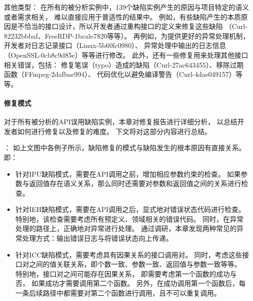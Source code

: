 
\vspace*{10pt}
\begin{center}
	\noindent{}
\end{center}

{其他类型}：
在所有的被分析实例中，139个缺陷实例产生的原因与项目特定的语义或者需求相关，
难以直接应用于普适性的结果中。
例如，有些缺陷产生的本质原因是不恰当的接口设计，所以开发者通过重构接口的定义来修复这些缺陷
（Curl-82232bbbaf、FreeRDP-1bcale7820等等）。
再例如，为提供更好的异常处理机制，开发者对日志记录接口（Linux-5b60fc0980）、
异常处理中输出的日志信息（OpenSSL-0cb8c9d85e）等等进行修改。
此外，还有一些修复用来处理其他接口相关错误，包括：
修复笔误（typo）造成的缺陷（Curl-27ac643455）、移除过期函数（FFmpeg-2dafbae994）、
代码优化以避免编译警告（Curl-4dae049157）等等。

\paragraph{修复模式}
对于所有被分析的API误用缺陷实例，本章对修复报告进行详细分析，
以总结开发者如何进行修复以及修复的难度。
下文将对这部分内容进行总结。

{}：
如上文图中各例子所示，缺陷修复的模式与缺陷发生的根本原因有直接关系。即：
\begin{itemize}
	\item 针对IPU缺陷模式，需要在API调用之前，增加相应参数约束的检查。
	如果参数与返回值存在语义关系，那么同时还需要对参数和返回值之间的关系进行检查。
	\item 针对IEH缺陷模式，需要在API调用之后，显式地对错误状态代码进行检查。
	特别地，该检查需要考虑所有预定义、领域相关的错误代码。
	同时，在异常处理的路径上，正确地对异常进行处理。
	通过调研，本章发现两种常见的异常处理方式：输出错误日志与将错误状态向上传递。
	\item 针对ICC缺陷模式，需要考虑具有因果关系的接口调用对。
	同时，考虑这些接口对之间的值关联关系，即个数一致、参数一致、返回值与参数一致等等。
	特别地，接口对之间可能存在因果关系，
	即需要考虑第一个函数的成功与否，
	如果成功才需要调用第二个函数。
	另外，在成功调用第一个函数后，每一条后续路径中都需要对第二个函数进行调用，且不可以重复调用。
\end{itemize}

